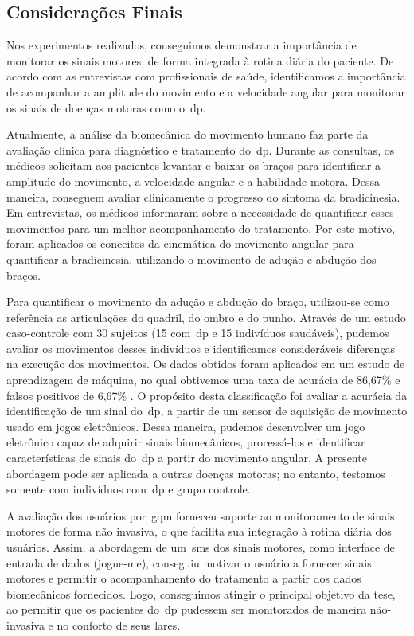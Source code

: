 \subsection{Considerações Finais}\label{sec:cons_finais}



Nos experimentos realizados, conseguimos demonstrar a importância de monitorar os sinais motores, de forma integrada à rotina diária do paciente. De acordo com as entrevistas com profissionais de saúde, identificamos a importância de acompanhar a amplitude do movimento e a velocidade angular para monitorar os sinais de doenças motoras como o~\ac{dp}.

Atualmente, a análise da biomecânica do movimento humano faz parte da avaliação clínica para diagnóstico e tratamento do~\ac{dp}. Durante as consultas, os médicos solicitam aos pacientes levantar e baixar os braços para identificar a amplitude do movimento, a velocidade angular e a habilidade motora. Dessa maneira, conseguem avaliar clinicamente o progresso do sintoma da bradicinesia. Em entrevistas, os médicos informaram sobre a necessidade de quantificar esses movimentos para um melhor acompanhamento do tratamento. Por este motivo, foram aplicados os conceitos da cinemática do movimento angular para quantificar a bradicinesia, utilizando o movimento de adução e abdução dos braços.

Para quantificar o movimento da adução e abdução do braço, utilizou-se como referência as articulações do quadril, do ombro e do punho. Através de um estudo caso-controle com 30 sujeitos (15 com~\ac{dp} e 15 indivíduos saudáveis), pudemos avaliar os movimentos desses indivíduos e identificamos consideráveis diferenças na execução dos movimentos. Os dados obtidos foram aplicados em um estudo de aprendizagem de máquina, no qual obtivemos uma taxa de acurácia de 86,67\% e falsos positivos de 6,67\% . O propósito desta classificação foi avaliar a acurácia da identificação de um sinal do~\ac{dp}, a partir de um sensor de aquisição de movimento usado em jogos eletrônicos. Dessa maneira, pudemos desenvolver um jogo eletrônico  capaz de adquirir sinais biomecânicos, processá-los e identificar características de sinais do~\ac{dp} a partir do movimento angular. A presente abordagem pode ser aplicada a outras doenças motoras; no entanto, testamos somente com indivíduos com~\ac{dp} e grupo controle.

A avaliação dos usuários por~\ac{gqm} forneceu suporte ao monitoramento de sinais motores de forma não invasiva, o que facilita sua integração à rotina diária dos usuários. Assim, a abordagem de um~\ac{sms} dos sinais motores, como interface de entrada de dados (\ac{jogue-me}), conseguiu motivar o usuário  a fornecer sinais motores e permitir o acompanhamento do tratamento a partir dos dados biomecânicos fornecidos. Logo, conseguimos atingir o principal objetivo da tese, ao permitir que os pacientes do~\ac{dp} pudessem ser monitorados de maneira não-invasiva e no conforto de seus lares.



